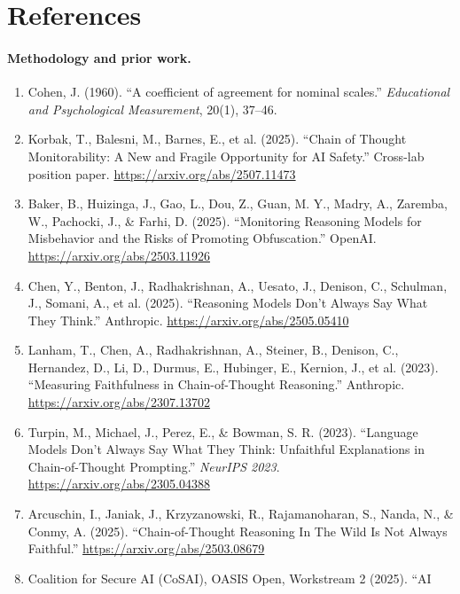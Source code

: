 \documentclass[10pt]{article}
\begin{document}
\section*{References}

{\small

\paragraph{Methodology and prior work.}
\begin{enumerate}[leftmargin=1.6em, itemsep=1pt, topsep=2pt, parsep=0pt]
\item Cohen, J. (1960). ``A coefficient of agreement for nominal scales.''
  \emph{Educational and Psychological Measurement}, 20(1), 37--46.
\item Korbak, T., Balesni, M., Barnes, E., et al. (2025). ``Chain of Thought
  Monitorability: A New and Fragile Opportunity for AI Safety.'' Cross-lab
  position paper. \url{https://arxiv.org/abs/2507.11473}
\item Baker, B., Huizinga, J., Gao, L., Dou, Z., Guan, M. Y., Madry, A.,
  Zaremba, W., Pachocki, J., \& Farhi, D. (2025). ``Monitoring Reasoning
  Models for Misbehavior and the Risks of Promoting Obfuscation.'' OpenAI.
  \url{https://arxiv.org/abs/2503.11926}
\item Chen, Y., Benton, J., Radhakrishnan, A., Uesato, J., Denison, C.,
  Schulman, J., Somani, A., et al. (2025). ``Reasoning Models Don't Always
  Say What They Think.'' Anthropic. \url{https://arxiv.org/abs/2505.05410}
\item Lanham, T., Chen, A., Radhakrishnan, A., Steiner, B., Denison, C.,
  Hernandez, D., Li, D., Durmus, E., Hubinger, E., Kernion, J., et al.
  (2023). ``Measuring Faithfulness in Chain-of-Thought Reasoning.''
  Anthropic. \url{https://arxiv.org/abs/2307.13702}
\item Turpin, M., Michael, J., Perez, E., \& Bowman, S. R. (2023).
  ``Language Models Don't Always Say What They Think: Unfaithful
  Explanations in Chain-of-Thought Prompting.'' \emph{NeurIPS 2023}.
  \url{https://arxiv.org/abs/2305.04388}
\item Arcuschin, I., Janiak, J., Krzyzanowski, R., Rajamanoharan, S., Nanda,
  N., \& Conmy, A. (2025). ``Chain-of-Thought Reasoning In The Wild Is Not
  Always Faithful.'' \url{https://arxiv.org/abs/2503.08679}
\item Coalition for Secure AI (CoSAI), OASIS Open, Workstream 2 (2025). ``AI

\end{enumerate}}
\end{document}
